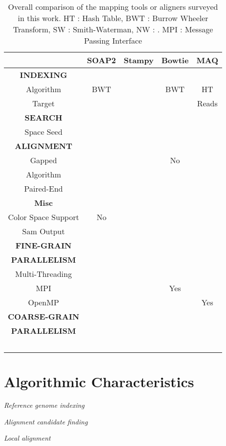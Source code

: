 \documentclass{sig-alternate}
\begin{document}
\begin{table}
\begin{tabular}{|c|c|c|c|c|} 
  \hline  
& SOAP2  & Stampy & Bowtie & MAQ  \\  \hline \hline
\textbf{INDEXING}  & & & &  \\
 Algorithm & BWT &  & BWT & HT \\
 Target &  &  & & Reads \\ \hline
\textbf{SEARCH} & & & & \\
Space Seed &  &   &   & \\ \hline
\textbf{ALIGNMENT} &  & & & \\
Gapped &  & & No &  \\ 
Algorithm & &  &  & \\ 
Paired-End &  &  &  & \\ \hline
\textbf{Misc}  &  &  &  & \\ 
Color Space Support  & No &  &  &   \\
Sam Output & &  &   & \\  \hline
\textbf{FINE-GRAIN} &  &  &  & \\ 
 \textbf{PARALLELISM} & & & & \\
Multi-Threading &  &  &  & \\ 
MPI & & & Yes &\\
OpenMP &  & &  & Yes \\  \hline
\textbf{COARSE-GRAIN}  & & & &\\ 
\textbf{PARALLELISM} & & & & \\\
& & & &  \\ \hline
\end{tabular} 



\caption{Overall comparison of the mapping tools or aligners surveyed in this work. HT : Hash Table, BWT : Burrow Wheeler Transform, SW : Smith-Waterman, NW : .  MPI : Message Passing Interface}
 \label{tbl:comp-aligner} 
\end{table}


\section{Algorithmic Characteristics}






\textit{Reference genome indexing}



\textit{Alignment candidate finding}


\textit{Local alignment}
\end{document}
